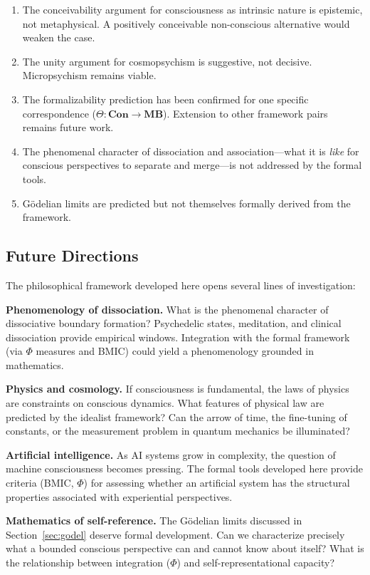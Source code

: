 \documentclass[11pt,a4paper]{article}
\theoremstyle{definition}
\theoremstyle{plain}
\theoremstyle{remark}
\newcommand{\Con}{\mathbf{Con}}
\newcommand{\MB}{\mathbf{MB}}
\begin{document}
\begin{enumerate}
    \item The conceivability argument for consciousness as intrinsic nature is epistemic, not metaphysical. A positively conceivable non-conscious alternative would weaken the case.
    \item The unity argument for cosmopsychism is suggestive, not decisive. Micropsychism remains viable.
    \item The formalizability prediction has been confirmed for one specific correspondence ($\Theta: \Con \to \MB$). Extension to other framework pairs remains future work.
    \item The phenomenal character of dissociation and association---what it is \textit{like} for conscious perspectives to separate and merge---is not addressed by the formal tools.
    \item G\"odelian limits are predicted but not themselves formally derived from the framework.
\end{enumerate}

\subsection{Future Directions}

The philosophical framework developed here opens several lines of investigation:

\textbf{Phenomenology of dissociation.} What is the phenomenal character of dissociative boundary formation? Psychedelic states, meditation, and clinical dissociation provide empirical windows. Integration with the formal framework (via $\Phi$ measures and BMIC) could yield a phenomenology grounded in mathematics.

\textbf{Physics and cosmology.} If consciousness is fundamental, the laws of physics are constraints on conscious dynamics. What features of physical law are predicted by the idealist framework? Can the arrow of time, the fine-tuning of constants, or the measurement problem in quantum mechanics be illuminated?

\textbf{Artificial intelligence.} As AI systems grow in complexity, the question of machine consciousness becomes pressing. The formal tools developed here provide criteria (BMIC, $\Phi$) for assessing whether an artificial system has the structural properties associated with experiential perspectives.

\textbf{Mathematics of self-reference.} The G\"odelian limits discussed in Section~\ref{sec:godel} deserve formal development. Can we characterize precisely what a bounded conscious perspective can and cannot know about itself? What is the relationship between integration ($\Phi$) and self-representational capacity?
\end{document}
